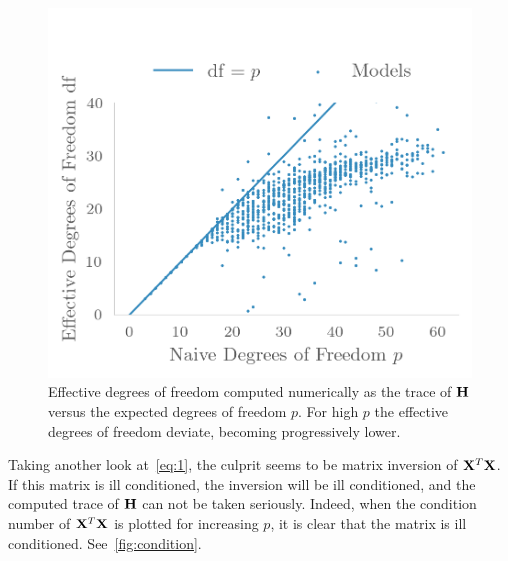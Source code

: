 \begin{figure}[]
  \centering
  \includegraphics[]{figures/effectivedf.png}
  \caption{\label{fig:effectivedf} Effective degrees of freedom computed
    numerically as the trace of \(\vb{H}\) versus the expected degrees
    of freedom \(p\). For high \(p\) the effective degrees of freedom deviate,
    becoming progressively lower.}
\end{figure}

Taking another look at~\cref{eq:1}, the culprit seems to be matrix inversion of
\(\vb{X}^{T}\vb{X}\). If this matrix is ill conditioned, the inversion will
be ill conditioned, and the computed trace of \(\vb{H}\) can not be taken
seriously. Indeed, when the condition number of \(\vb{X}^{T}\vb{X}\) is plotted
for increasing \(p\), it is clear that the matrix is ill conditioned.
See~\cref{fig:condition}.  

